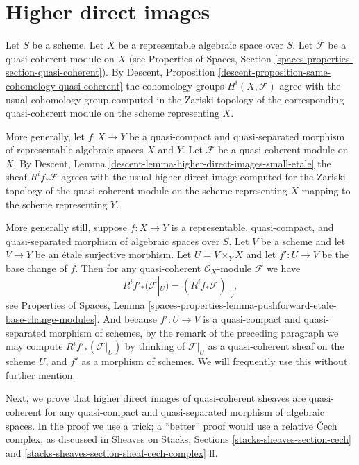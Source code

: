 \documentclass{stacks-project}
\theoremstyle{plain}
\theoremstyle{definition}
\theoremstyle{remark}
\numberwithin{equation}{subsection}
\begin{document}
\section{Higher direct images}
\label{section-higher-direct-image}

\noindent
Let $S$ be a scheme. Let $X$ be a representable algebraic space over $S$.
Let $\mathcal{F}$ be a quasi-coherent module on $X$ (see
Properties of Spaces, Section \ref{spaces-properties-section-quasi-coherent}).
By
Descent, Proposition \ref{descent-proposition-same-cohomology-quasi-coherent}
the cohomology groups $H^i(X, \mathcal{F})$ agree with the usual
cohomology group computed in the Zariski topology of the corresponding
quasi-coherent module on the scheme representing $X$.

\medskip\noindent
More generally, let $f : X \to Y$ be a quasi-compact and quasi-separated
morphism of representable algebraic spaces $X$ and $Y$. Let
$\mathcal{F}$ be a quasi-coherent module on $X$. By
Descent, Lemma \ref{descent-lemma-higher-direct-images-small-etale}
the sheaf $R^if_*\mathcal{F}$ agrees with the
usual higher direct image computed for the Zariski topology
of the quasi-coherent module on the scheme representing $X$
mapping to the scheme representing $Y$.

\medskip\noindent
More generally still, suppose $f : X \to Y$ is a
representable, quasi-compact, and
quasi-separated morphism of algebraic spaces over $S$. Let $V$ be a scheme
and let $V \to Y$ be an \'etale surjective morphism. Let $U = V \times_Y X$
and let $f' : U \to V$ be the base change of $f$. Then for any
quasi-coherent $\mathcal{O}_X$-module $\mathcal{F}$ we have
\begin{equation}
\label{equation-representable-higher-direct-image}
R^if'_*(\mathcal{F}|_U) = (R^if_*\mathcal{F})|_V,
\end{equation}
see
Properties of Spaces,
Lemma \ref{spaces-properties-lemma-pushforward-etale-base-change-modules}.
And because $f' : U \to V$ is a quasi-compact and quasi-separated
morphism of schemes, by the remark of the preceding paragraph we may
compute $R^if'_*(\mathcal{F}|_U)$ by thinking of $\mathcal{F}|_U$ as a
quasi-coherent sheaf on the scheme $U$, and $f'$ as a morphism of schemes.
We will frequently use this without further mention.

\medskip\noindent
Next, we prove that higher direct images of quasi-coherent sheaves are
quasi-coherent for any quasi-compact and quasi-separated morphism of
algebraic spaces. In the proof we use a trick; a ``better'' proof would
use a relative {\v C}ech complex, as discussed in
Sheaves on Stacks, Sections \ref{stacks-sheaves-section-cech} and
\ref{stacks-sheaves-section-sheaf-cech-complex} ff.
\end{document}
